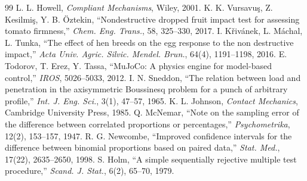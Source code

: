\documentclass[a4paper,twocolumn,10pt]{ltjsarticle}
\begin{document}
\begin{thebibliography}{99}
 L. L. Howell, \textit{Compliant Mechanisms}, Wiley, 2001.
 K. K. Vursavuş, Z. Kesilmiş, Y. B. Öztekin, ``Nondestructive dropped fruit impact test for assessing tomato firmness,'' \textit{Chem. Eng. Trans.}, 58, 325--330, 2017.
 I. Křivánek, L. Máchal, L. Tunka, ``The effect of hen breeds on the egg response to the non destructive impact,'' \textit{Acta Univ. Agric. Silvic. Mendel. Brun.}, 64(4), 1191--1198, 2016.
 E. Todorov, T. Erez, Y. Tassa, ``MuJoCo: A physics engine for model-based control,'' \textit{IROS}, 5026--5033, 2012.
 I. N. Sneddon, ``The relation between load and penetration in the axisymmetric Boussinesq problem for a punch of arbitrary profile,'' \textit{Int. J. Eng. Sci.}, 3(1), 47--57, 1965.
 K. L. Johnson, \textit{Contact Mechanics}, Cambridge University Press, 1985.
 Q. McNemar, ``Note on the sampling error of the difference between correlated proportions or percentages,'' \textit{Psychometrika}, 12(2), 153--157, 1947.
 R. G. Newcombe, ``Improved confidence intervals for the difference between binomial proportions based on paired data,'' \textit{Stat. Med.}, 17(22), 2635--2650, 1998.
 S. Holm, ``A simple sequentially rejective multiple test procedure,'' \textit{Scand. J. Stat.}, 6(2), 65--70, 1979.
\end{thebibliography}
\end{document}
